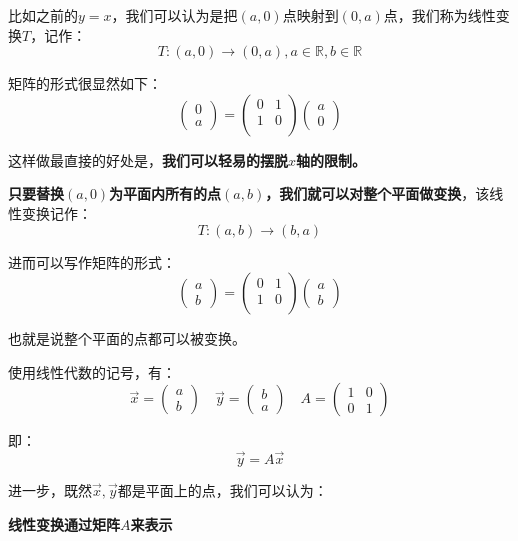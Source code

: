 \documentclass[12pt]{article}
\begin{document}
比如之前的$y=x$，我们可以认为是把$(a,0)$点映射到$(0,a)$点，我们称为线性变换$T$，记作：
$$
T:(a,0) \rightarrow (0,a), a \in \mathbb{R}, b \in \mathbb{R}
$$

矩阵的形式很显然如下：
$$
\begin{pmatrix}
0 \\ a
\end{pmatrix}
= \begin{pmatrix}
0 & 1 \\
1 & 0 \\
\end{pmatrix}
\begin{pmatrix}
a \\ 0
\end{pmatrix}
$$

这样做最直接的好处是，\textbf{我们可以轻易的摆脱$x$轴的限制。}

\textbf{只要替换$(a,0)$为平面内所有的点$(a,b)$，我们就可以对整个平面做变换}，该线性变换记作：
$$
T:(a,b) \rightarrow (b,a)
$$

进而可以写作矩阵的形式：
$$
\begin{pmatrix}
a \\ b
\end{pmatrix}
= \begin{pmatrix}
0 & 1 \\
1 & 0 \\
\end{pmatrix}
\begin{pmatrix}
a \\ b
\end{pmatrix}
$$

也就是说整个平面的点都可以被变换。

使用线性代数的记号，有：
$$
\vec{x} = \begin{pmatrix}
a \\ b
\end{pmatrix} \quad
\vec{y} = \begin{pmatrix}
b \\ a
\end{pmatrix} \quad
A = \begin{pmatrix}
1&0 \\ 0&1
\end{pmatrix}
$$

即：
$$
\vec{y} = A\vec{x}
$$

进一步，既然$\vec{x},\vec{y}$都是平面上的点，我们可以认为：
\begin{center}
\textbf{线性变换通过矩阵$A$来表示}
\end{center}
\end{document}
